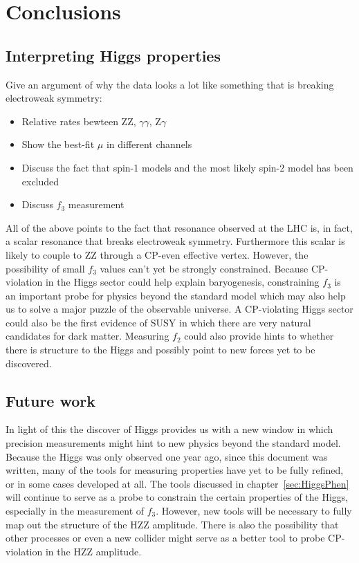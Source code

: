 \chapter{Conclusions}
\label{sec:Conclusions}

\section{Interpreting Higgs properties}

Give an argument of why the data looks a lot like 
something that is breaking electroweak symmetry:

\begin{itemize}
  \item Relative rates bewteen ZZ, $\gamma\gamma$, Z$\gamma$
  \item Show the best-fit $\mu$ in different channels
  \item Discuss the fact that spin-1 models and the most 
    likely spin-2 model has been excluded
  \item Discuss $f_3$ measurement
\end{itemize}

All of the above points to the fact that resonance observed
at the LHC is, in fact, a scalar resonance that breaks electroweak 
symmetry.  Furthermore this scalar is likely to couple to 
ZZ through a CP-even effective vertex.  However, the possibility
of small $f_3$ values can't yet be strongly constrained.  Because 
CP-violation in the Higgs sector could help explain 
baryogenesis, constraining $f_3$ is an important probe for physics
beyond the standard model which may also help us to solve a major
puzzle of the observable universe.  
A CP-violating Higgs sector could also be the first evidence of 
SUSY in which there are very natural candidates for dark matter. 
Measuring $f_2$ could also
provide hints to whether there is structure to the Higgs and
possibly point to new forces yet to be discovered.  

\section{Future work}

In light of this the discover of Higgs provides us with a new 
window in which precision measurements might hint to new physics
beyond the standard model.  Because the Higgs was only observed
one year ago, since this document was written, many of the tools
for measuring properties have yet to be fully refined, or in some
cases developed at all.  The tools discussed in 
chapter~\ref{sec:HiggsPhen} will continue to serve as a probe to 
constrain the certain properties of the Higgs, especially in the
measurement of $f_3$.  However, new tools will be necessary to 
fully map out the structure of the HZZ amplitude.  There is 
also the possibility that other processes or even a new collider 
might serve as a better tool to probe CP-violation in the HZZ 
amplitude.  

